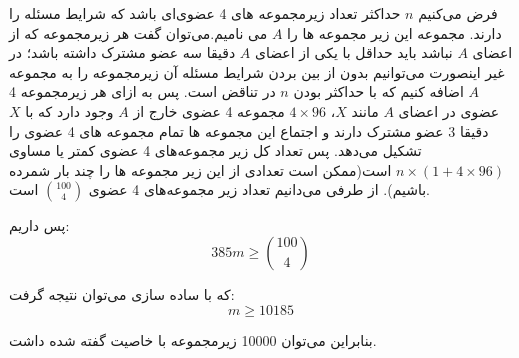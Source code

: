     فرض می‌کنیم $n$ حداکثر تعداد زیرمجموعه های 4 عضوی‌ای باشد که شرایط مسئله را دارند. مجموعه این زیر مجموعه ها را $A$ می نامیم.می‌توان گفت هر زیرمجموعه که از اعضای $A$ نباشد باید حداقل با یکی از اعضای $A$ دقیقا سه عضو مشترک داشته باشد؛ در غیر اینصورت می‌توانیم بدون از بین بردن شرایط مسئله آن زیرمجموعه را به مجموعه $A$ اضافه کنیم که با حداکثر بودن $n$ در تناقض است. پس به ازای هر زیرمجموعه 4 عضوی در اعضای $A$ مانند $X$، $4 \times 96$ مجموعه 4 عضوی خارج از $A$ وجود دارد که با $X$ دقیقا 3 عضو مشترک دارند و اجتماع این مجموعه ها تمام مجموعه های 4 عضوی را تشکیل می‌دهد. پس تعداد کل زیر مجموعه‌های 4 عضوی کمتر یا مساوی $n \times (1 + 4 \times 96)$ است(ممکن است تعدادی از این زیر مجموعه ها را چند بار شمرده باشیم). از طرفی می‌دانیم تعداد زیر مجموعه‌های 4 عضوی $ 100 \choose 4 $ است.

	پس داریم:
	$$ 385m \ge { 100 \choose 4} $$

	که با ساده سازی می‌توان نتیجه گرفت:
    $$m \ge 10185$$
    
    بنابراین می‌توان 10000 زیرمجموعه با خاصیت گفته شده داشت.